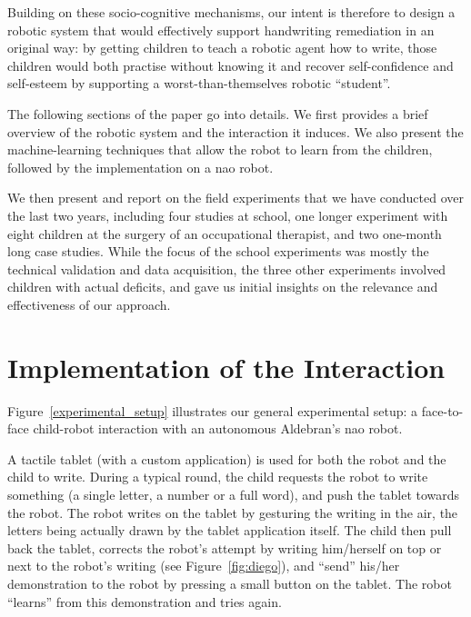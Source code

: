 \documentclass{article}
\begin{document}
Building on these socio-cognitive mechanisms, our intent is therefore to design
a robotic system that would effectively support handwriting remediation in an
original way: by getting children to teach a robotic agent how to write, those
children would both practise without knowing it and recover self-confidence and
self-esteem by supporting a worst-than-themselves robotic ``student''.

The following sections of the paper go into details. We first provides a brief
overview of the robotic system and the interaction it induces. We also present
the machine-learning techniques that allow the robot to learn from the children,
followed by the implementation on a {\sc nao} robot.

We then present and report on the field experiments that we have conducted over
the last two years, including four studies at school, one longer experiment with
eight children at the surgery of an occupational therapist, and two one-month
long case studies. While the focus of the school experiments was mostly the
technical validation and data acquisition, the three other experiments involved
children with actual deficits, and gave us initial insights on the relevance and
effectiveness of our approach.

\section{Implementation of the Interaction}

Figure~\ref{experimental_setup} illustrates our general experimental setup: a
face-to-face child-robot interaction with an autonomous Aldebran's {\sc nao}
robot.

A tactile tablet (with a custom application) is used for both the robot and the
child to write. During a typical round, the child requests the robot to write
something (a single letter, a number or a full word), and push the tablet
towards the robot. The robot writes on the tablet by gesturing the writing in
the air,  the letters being actually drawn by the tablet application itself. The
child then pull back the tablet, corrects the robot's attempt by writing
him/herself on top or next to the robot's writing (see Figure~\ref{fig:diego}),
and ``send'' his/her demonstration to the robot by pressing a small button on
the tablet. The robot ``learns'' from this demonstration and tries again.
\end{document}
